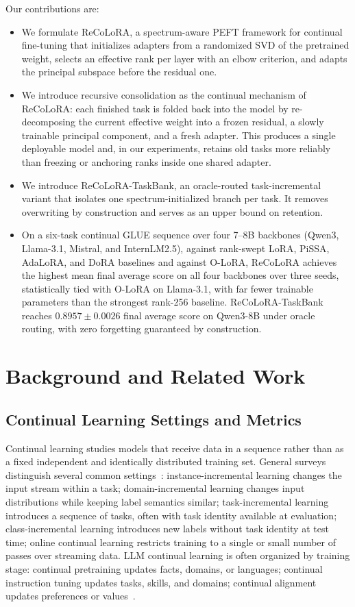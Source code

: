 \documentclass[11pt]{article}
\begin{document}
Our contributions are:
\begin{itemize}
    \item We formulate ReCoLoRA, a spectrum-aware PEFT framework for continual fine-tuning that initializes adapters from a randomized SVD of the pretrained weight, selects an effective rank per layer with an elbow criterion, and adapts the principal subspace before the residual one.
    \item We introduce recursive consolidation as the continual mechanism of ReCoLoRA: each finished task is folded back into the model by re-decomposing the current effective weight into a frozen residual, a slowly trainable principal component, and a fresh adapter. This produces a single deployable model and, in our experiments, retains old tasks more reliably than freezing or anchoring ranks inside one shared adapter.
    \item We introduce ReCoLoRA-TaskBank, an oracle-routed task-incremental variant that isolates one spectrum-initialized branch per task. It removes overwriting by construction and serves as an upper bound on retention.
    \item On a six-task continual GLUE sequence over four 7--8B backbones (Qwen3, Llama-3.1, Mistral, and InternLM2.5), against rank-swept LoRA, PiSSA, AdaLoRA, and DoRA baselines and against O-LoRA, ReCoLoRA achieves the highest mean final average score on all four backbones over three seeds, statistically tied with O-LoRA on Llama-3.1, with far fewer trainable parameters than the strongest rank-256 baseline. ReCoLoRA-TaskBank reaches $0.8957\pm0.0026$ final average score on Qwen3-8B under oracle routing, with zero forgetting guaranteed by construction.
\end{itemize}

\section{Background and Related Work}
\subsection{Continual Learning Settings and Metrics}
Continual learning studies models that receive data in a sequence rather than as a fixed independent and identically distributed training set. General surveys distinguish several common settings~\cite{wang2024comprehensivecl}: instance-incremental learning changes the input stream within a task; domain-incremental learning changes input distributions while keeping label semantics similar; task-incremental learning introduces a sequence of tasks, often with task identity available at evaluation; class-incremental learning introduces new labels without task identity at test time; online continual learning restricts training to a single or small number of passes over streaming data. LLM continual learning is often organized by training stage: continual pretraining updates facts, domains, or languages; continual instruction tuning updates tasks, skills, and domains; continual alignment updates preferences or values~\cite{weng2024continualllm}.
\end{document}
